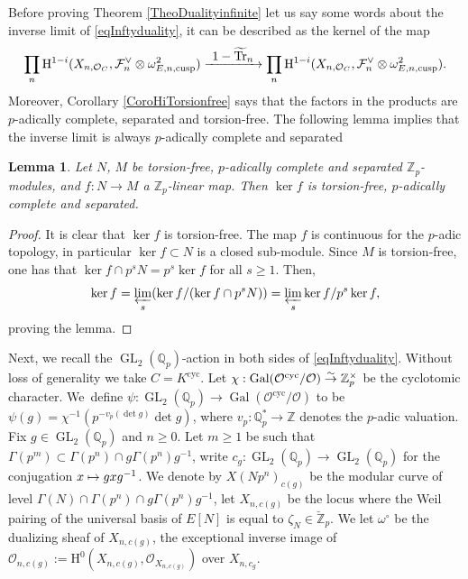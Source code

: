 \documentclass[JEP,XML,SOM,Unicode,published]{cedram}
\newcommand\mto{\mathchoice{\longmapsto}{\mapsto}{\mapsto}{\mapsto}}
\newcommand\To[1]{\mathchoice{\xrightarrow{\textstyle\kern4pt#1\kern3pt}}{\stackrel{#1}{\to}}{}{}}
\newcommand{\cusp}{\mathrm{cusp}}
\newcommand{\cyc}{\mathrm{cyc}}
\numberwithin{equation}{section}
\newtheorem{lem}[prop]{Lemma}
\theoremstyle{definition}
\newcommand{\bb}[1]{\mathbb{#1}}
\newcommand{\n}[1]{\mathcal{#1}}
\newcommand{\s}[1]{\mathscr{#1}}
\DeclareMathOperator{\GL}{GL}
\DeclareMathOperator{\Tr}{Tr}
\DeclareMathOperator{\Gal}{Gal}
\begin{document}
Before proving Theorem \ref{TheoDualityinfinite} let us say some words about the inverse limit of \eqref{eqInftyduality}, it can be described as the kernel of the map
\[
\prod_{n} \mathrm{H}^{1-i}(X_{n,\n{O}_C}, \n{F}_n^{\vee} \otimes \omega^2_{E,n,\cusp}) \To{1- \widetilde{\Tr}_n} \prod_{n} \mathrm{H}^{1-i}(X_{n,\n{O}_C}, \n{F}_n^{\vee} \otimes \omega^2_{E,n,\cusp}).
\]
Moreover, Corollary \ref{CoroHiTorsionfree} says that the factors in the products are $p$-adically complete, separated and torsion-free. The following lemma implies that the inverse limit is always $p$-adically complete and separated

\begin{lem}
Let $N$, $M$ be torsion-free, $p$-adically complete and separated $\bb{Z}_p$\nobreakdash-mod\-ules, and $f:N \to M$ a $\bb{Z}_p$-linear map. Then $\ker f$ is torsion-free, $p$-adically complete and separated.
\end{lem}

\begin{proof}
It is clear that $\ker f$ is torsion-free. The map $f$ is continuous for the $p$-adic topology, in particular $\ker f \subset N$ is a closed sub-module. Since $M$ is torsion-free, one has that $\ker f\cap p^sN = p^s \ker f $ for all $s\geq 1$. Then,
\[
\ker f = \varprojlim_s (\ker f/ (\ker f\cap p^s N))= \varprojlim_s \ker f/p^s \ker f,
\]
proving the lemma.
\end{proof}

Next, we recall the $\GL_2(\bb{Q}_p)$-action in both sides of \eqref{eqInftyduality}. Without loss of generality we take $C=K^{\cyc}$. Let $ \chi: \Gal(\n{O}^{\cyc}/ \n{O}) \To{\sim} \bb{Z}_p^{\times} $ be the cyclotomic character. We~define $\psi: \GL_2(\bb{Q}_p)\to \Gal(\n{O}^{\cyc}/ \n{O})$ to be $\psi(g)= \chi^{-1} (p^{-v_p(\det g)} \det g)$, where $v_p: \bb{Q}_p^*\to \bb{Z}$ denotes the $p$-adic valuation. Fix $g\in \GL_2(\bb{Q}_p)$ and $n\geq 0$. Let $m\geq 1$ be such that $\Gamma(p^m)\subset \Gamma(p^n)\cap g \Gamma(p^n)g^{-1}$, write $c_g: \GL_2(\bb{Q}_p)\to \GL_2(\bb{Q}_p)$ for the conjugation $x\mto g x g^{-1}$. We denote by $X(Np^n)_{c(g)}$ be the modular curve of level $\Gamma(N)\cap \Gamma(p^n)\cap g \Gamma(p^n) g^{-1}$, let $X_{n,c(g)}$ be the locus where the Weil pairing of the universal basis of $E[N]$ is equal to $\zeta_N\in \breve{\bb{Z}}_p$. We let $\omega^{\circ}$ be the dualizing sheaf of $X_{n,c(g)}$, \ie the exceptional inverse image of $\n{O}_{n,c(g)}:= \mathrm{H}^0(X_{n,c(g)}, \s{O}_{X_{n,c(g)}})$ over $X_{n,c_{g}}$.
\end{document}
